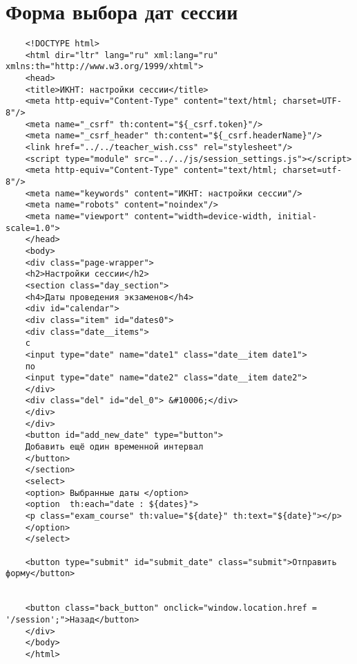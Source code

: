 \chapter{Форма выбора дат сессии}\label{appendix-date}	

\begin{lstlisting}
	<!DOCTYPE html>
	<html dir="ltr" lang="ru" xml:lang="ru" xmlns:th="http://www.w3.org/1999/xhtml">
	<head>
	<title>ИКНТ: настройки сессии</title>
	<meta http-equiv="Content-Type" content="text/html; charset=UTF-8"/>
	<meta name="_csrf" th:content="${_csrf.token}"/>
	<meta name="_csrf_header" th:content="${_csrf.headerName}"/>
	<link href="../../teacher_wish.css" rel="stylesheet"/>
	<script type="module" src="../../js/session_settings.js"></script>
	<meta http-equiv="Content-Type" content="text/html; charset=utf-8"/>
	<meta name="keywords" content="ИКНТ: настройки сессии"/>
	<meta name="robots" content="noindex"/>
	<meta name="viewport" content="width=device-width, initial-scale=1.0">
	</head>
	<body>
	<div class="page-wrapper">
	<h2>Настройки сессии</h2>
	<section class="day_section">
	<h4>Даты проведения экзаменов</h4>
	<div id="calendar">
	<div class="item" id="dates0">
	<div class="date__items">
	с
	<input type="date" name="date1" class="date__item date1">
	по
	<input type="date" name="date2" class="date__item date2">
	</div>
	<div class="del" id="del_0"> &#10006;</div>
	</div>
	</div>
	<button id="add_new_date" type="button">
	Добавить ещё один временной интервал
	</button>
	</section>
	<select>
	<option> Выбранные даты </option>
	<option  th:each="date : ${dates}">
	<p class="exam_course" th:value="${date}" th:text="${date}"></p>
	</option>
	</select>
	
	<button type="submit" id="submit_date" class="submit">Отправить форму</button>
	
	
	<button class="back_button" onclick="window.location.href = '/session';">Назад</button>
	</div>
	</body>
	</html>
\end{lstlisting}